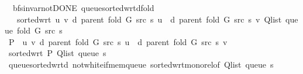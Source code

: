 \begin{isabellebody}
\isanewline
{}\isamarkupfalse%
%
\endisatagproof
{\isafoldproof}%
%
\isadelimproof
\isanewline
%
\endisadelimproof
\isanewline
{}\isamarkupfalse%
\ {\isacharparenleft}{\kern0pt}\ bfs{\isacharunderscore}{\kern0pt}invar{\isacharunderscore}{\kern0pt}not{\isacharunderscore}{\kern0pt}DONE{\isacharparenright}{\kern0pt}\ queue{\isacharunderscore}{\kern0pt}sorted{\isacharunderscore}{\kern0pt}wrt{\isacharunderscore}{\kern0pt}d{\isacharunderscore}{\kern0pt}fold{\isacharcolon}{\kern0pt}\isanewline
\ \ \ {\isachardoublequoteopen}sorted{\isacharunderscore}{\kern0pt}wrt\ {\isacharparenleft}{\kern0pt}{\isasymlambda}u\ v{\isachardot}{\kern0pt}\ d\ {\isacharparenleft}{\kern0pt}parent\ {\isacharparenleft}{\kern0pt}fold\ G\ src\ s{\isacharparenright}{\kern0pt}{\isacharparenright}{\kern0pt}\ u\ {\isasymle}\ d\ {\isacharparenleft}{\kern0pt}parent\ {\isacharparenleft}{\kern0pt}fold\ G\ src\ s{\isacharparenright}{\kern0pt}{\isacharparenright}{\kern0pt}\ v{\isacharparenright}{\kern0pt}\ {\isacharparenleft}{\kern0pt}Q{\isacharunderscore}{\kern0pt}list\ {\isacharparenleft}{\kern0pt}queue\ {\isacharparenleft}{\kern0pt}fold\ G\ src\ s{\isacharparenright}{\kern0pt}{\isacharparenright}{\kern0pt}{\isacharparenright}{\kern0pt}{\isachardoublequoteclose}\isanewline
%
\isadelimproof
%
\endisadelimproof
%
\isatagproof
{}\isamarkupfalse%
\ {\isacharminus}{\kern0pt}\isanewline
\ \ \isamarkupfalse%
\ {\isacharquery}{\kern0pt}P\ {\isacharequal}{\kern0pt}\ {\isachardoublequoteopen}{\isasymlambda}u\ v{\isachardot}{\kern0pt}\ d\ {\isacharparenleft}{\kern0pt}parent\ {\isacharparenleft}{\kern0pt}fold\ G\ src\ s{\isacharparenright}{\kern0pt}{\isacharparenright}{\kern0pt}\ u\ {\isasymle}\ d\ {\isacharparenleft}{\kern0pt}parent\ {\isacharparenleft}{\kern0pt}fold\ G\ src\ s{\isacharparenright}{\kern0pt}{\isacharparenright}{\kern0pt}\ v{\isachardoublequoteclose}\isanewline
\ \ \isamarkupfalse%
\ {\isachardoublequoteopen}sorted{\isacharunderscore}{\kern0pt}wrt\ {\isacharquery}{\kern0pt}P\ {\isacharparenleft}{\kern0pt}Q{\isacharunderscore}{\kern0pt}list\ {\isacharparenleft}{\kern0pt}queue\ s{\isacharparenright}{\kern0pt}{\isacharparenright}{\kern0pt}{\isachardoublequoteclose}\isanewline
\ \ \ \ \isamarkupfalse%
\ queue{\isacharunderscore}{\kern0pt}sorted{\isacharunderscore}{\kern0pt}wrt{\isacharunderscore}{\kern0pt}d\ not{\isacharunderscore}{\kern0pt}white{\isacharunderscore}{\kern0pt}if{\isacharunderscore}{\kern0pt}mem{\isacharunderscore}{\kern0pt}queue\ sorted{\isacharunderscore}{\kern0pt}wrt{\isacharunderscore}{\kern0pt}mono{\isacharunderscore}{\kern0pt}rel{\isacharbrackleft}{\kern0pt}of\ {\isachardoublequoteopen}{\isacharparenleft}{\kern0pt}Q{\isacharunderscore}{\kern0pt}list\ {\isacharparenleft}{\kern0pt}queue\ s{\isacharparenright}{\kern0pt}{\isacharparenright}{\kern0pt}{\isachardoublequoteclose}{\isacharbrackright}{\kern0pt}\isanewline

\end{isabellebody}
